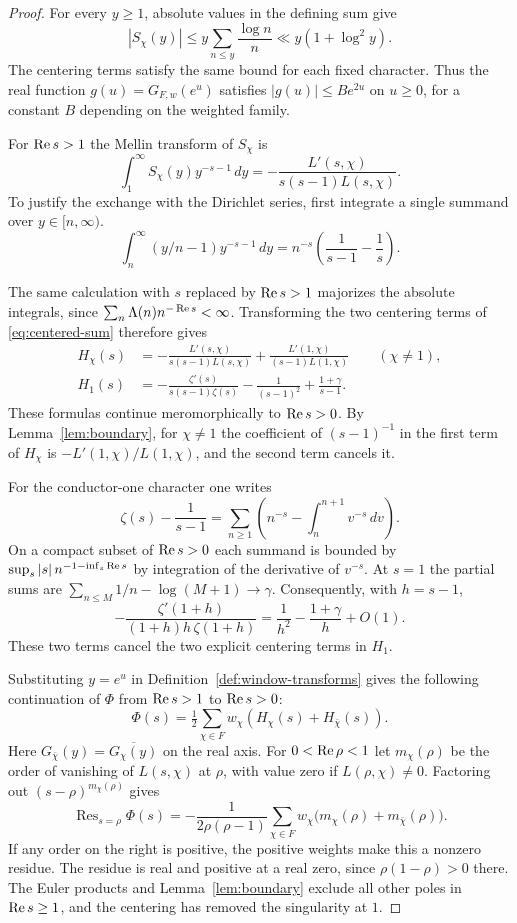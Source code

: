 \begin{proof}
For every \(y\ge1\), absolute values in the defining sum give
\[
 |S_\chi(y)|\le y\sum_{n\le y}\frac{\log n}{n}
             \ll y(1+\log^2 y).
\]
The centering terms satisfy the same bound for each fixed character.
Thus the real function \(g(u)=G_{F,w}(e^u)\) satisfies \(|g(u)|\le B e^{2u}\) on
\(u\ge0\), for a constant \(B\) depending on the weighted family.

For \(\operatorname{Re} s>1\) the Mellin transform of \(S_\chi\) is
\[
 \int_1^\infty S_\chi(y)y^{-s-1}\,dy
    =-\frac{L'(s,\chi)}{s(s-1)L(s,\chi)} .
\]
To justify the exchange with the Dirichlet series, first integrate
a single summand over \(y\in[n,\infty)\).
\[
 \int_n^\infty(y/n-1)y^{-s-1}\,dy
   = n^{-s}\left(\frac1{s-1}-\frac1s\right).
\]

The same calculation with \(s\) replaced by \(\operatorname{Re} s>1\)
majorizes the absolute integrals, since
\(\sum_n\Lambda(n)n^{-\operatorname{Re} s}<\infty\).
Transforming the two centering terms of \eqref{eq:centered-sum} therefore gives
\begin{align*}
 H_\chi(s)&=-\frac{L'(s,\chi)}{s(s-1)L(s,\chi)}
        +\frac{L'(1,\chi)}{(s-1)L(1,\chi)} \qquad(\chi\ne 1),\\
 H_1(s)&=-\frac{\zeta'(s)}{s(s-1)\zeta(s)}
        -\frac{1}{(s-1)^2}+\frac{1+\gamma}{s-1}.
\end{align*}
These formulas continue meromorphically to \(\operatorname{Re} s>0\).
By Lemma~\ref{lem:boundary}, for \(\chi\ne1\) the coefficient of
\((s-1)^{-1}\) in the first term of \(H_\chi\) is
\(-L'(1,\chi)/L(1,\chi)\), and the second term cancels it.

For the conductor-one character one writes
\[
 \zeta(s)-\frac1{s-1}
   =\sum_{n\ge1}\left(n^{-s}-\int_n^{n+1}v^{-s}\,dv\right).
\]
On a compact subset of \(\operatorname{Re} s>0\) each summand is bounded
by \(\sup_{s}|s|\,n^{-1-\inf_s\operatorname{Re} s}\) by integration of
the derivative of \(v^{-s}\). At \(s=1\) the partial sums are
\(\sum_{n\le M}1/n-\log(M+1)\to\gamma\). Consequently, with
\(h=s-1\),
\[
 -\frac{\zeta'(1+h)}{(1+h)h\,\zeta(1+h)}
      =\frac{1}{h^2}-\frac{1+\gamma}{h}+O(1).
\]
These two terms cancel the two explicit centering terms in \(H_1\).

Substituting \(y=e^u\) in Definition~\ref{def:window-transforms} gives the
following continuation of \(\Phi\) from \(\operatorname{Re} s>1\) to \(\operatorname{Re} s>0\):
\[
 \Phi(s)=\tfrac12\sum_{\chi\in F}w_\chi
                         (H_\chi(s)+H_{\bar\chi}(s)).
\]
Here \(G_{\bar\chi}(y)=\overline{G_\chi(y)}\) on the real axis.
For \(0<\operatorname{Re}\rho<1\) let \(m_\chi(\rho)\) be the order of
vanishing of \(L(s,\chi)\) at \(\rho\), with value zero if
\(L(\rho,\chi)\ne0\). Factoring out \((s-\rho)^{m_\chi(\rho)}\)
gives
\[
 \operatorname{Res}_{s=\rho}\Phi(s)=
 -\frac{1}{2\rho(\rho-1)}
       \sum_{\chi\in F}w_\chi
                \bigl(m_\chi(\rho)+m_{\bar\chi}(\rho)\bigr).
\]
If any order on the right is positive, the positive weights
make this a nonzero residue. The residue is real and positive
at a real zero, since \(\rho(1-\rho)>0\) there. The Euler products and Lemma~\ref{lem:boundary}
exclude all other poles in \(\operatorname{Re} s\ge 1\), and the centering
has removed the singularity at \(1\).


\end{proof}
